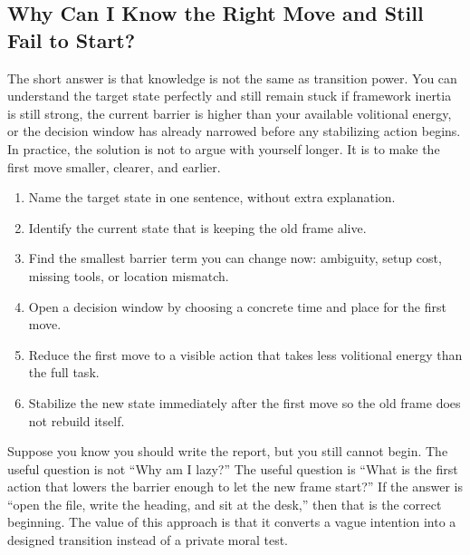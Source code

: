 \subsection{Why Can I Know the Right Move and Still Fail to Start?}

The short answer is that knowledge is not the same as transition power. You can
understand the target state perfectly and still remain stuck if framework
inertia is still strong, the current barrier is higher than your available
volitional energy, or the decision window has already narrowed before any
stabilizing action begins. In practice, the solution is not to argue with
yourself longer. It is to make the first move smaller, clearer, and earlier.

\begin{enumerate}[nosep]
  \item Name the target state in one sentence, without extra explanation.
  \item Identify the current state that is keeping the old frame alive.
  \item Find the smallest barrier term you can change now: ambiguity, setup
        cost, missing tools, or location mismatch.
  \item Open a decision window by choosing a concrete time and place for the
        first move.
  \item Reduce the first move to a visible action that takes less volitional
        energy than the full task.
  \item Stabilize the new state immediately after the first move so the old
        frame does not rebuild itself.
\end{enumerate}

\begin{remark}
Suppose you know you should write the report, but you still cannot begin.
The useful question is not ``Why am I lazy?'' The useful question is ``What is
the first action that lowers the barrier enough to let the new frame start?''
If the answer is ``open the file, write the heading, and sit at the desk,''
then that is the correct beginning. The value of this approach is that it
converts a vague intention into a designed transition instead of a private
moral test.
\end{remark}
